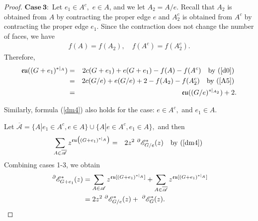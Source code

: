 \begin{proof}
$\mathbf{Case ~3}:$
Let $e_{1}\in A^{c},$ $e\in A$, and we let $A_{2}=A/e$.  Recall that $ A_{2}$ is  obtained  from $ A $ by contracting the proper edge  $e$ and  $A^{c}_{2}$  is  obtained  from  $A^{c}$  by contracting the proper edge  $e_{1}$.  Since the contraction  does not change the number of faces, we have
\begin{eqnarray}\label{A5}
f(A)=f(A_{2}), \quad f(A^{c})=f(A_{2}^{c}).
\end{eqnarray}
    Therefore,
\begin{eqnarray}\label{dm4}
{\mathfrak{eu}}((G+e_{1})^{*|_{ A}})&=&2c(G+e_{1})+e(G+e_{1})-f(A)-f(A^{c})\quad\text{by (\ref{d0}) }\notag\\
&=&2c(G/e)+e(G/e)+2-f(A_{2})-f(A_{2}^{c})\quad\text{by (\ref{A5})  }\notag\\
&=&{\mathfrak{eu}}((G/e)^{*| _{A_{2}}})+2.
\end{eqnarray}

 Similarly, formula (\ref{dm4}) also holds for the case: $e\in A^{c},$ and $e_{1}\in A.$

 Let  $\overline{\mathscr{A}}=\{A|e_{1}\in A^{c}, e\in A\}\cup \{A|e\in A^{c}, e_{1}\in A\},$ and  then
 \begin{eqnarray}\label{dm5}
\sum\limits_{A\in \overline{\mathscr{A}}}z^{{\mathfrak{eu}}\big((G+e_{1})^{*|_A}\big)}&=&2z^{2} ~^{\partial}{{\mathscr{E}}}^{*}_{G/e}(z)  \quad\text{by (\ref{dm4}) }
\end{eqnarray}
Combining  cases 1-3, we obtain
$$
\begin {aligned}
 ~^{\partial}{{\mathscr{E}}}^{*}_{G+e_{1}}(z)&=\sum\limits_{A\in\mathscr{A}} z^{{\mathfrak{eu}}[(G+e_{1})^{*|_A}]}+\sum\limits_{A\in\overline{\mathscr{A}}} z^{{\mathfrak{eu}}[(G+e_{1})^{*|_A}]}\\
 &=2z^{2}~^{\partial}{{\mathscr{E}}}^{*}_{G/ e}(z)+~^{\partial}{{\mathscr{E}}}^{*}_{G}(z).\\
\end{aligned}
$$

\end{proof}

